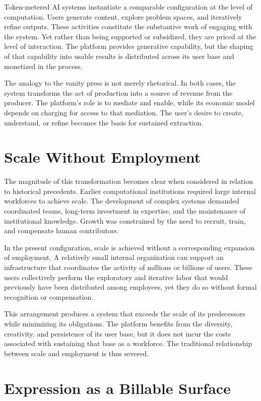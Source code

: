 \documentclass[12pt, oneside]{article}
\begin{document}
Token-metered AI systems instantiate a comparable configuration at the level of computation. Users generate content, explore problem spaces, and iteratively refine outputs. These activities constitute the substantive work of engaging with the system. Yet rather than being supported or subsidized, they are priced at the level of interaction. The platform provides generative capability, but the shaping of that capability into usable results is distributed across its user base and monetized in the process.

The analogy to the vanity press is not merely rhetorical. In both cases, the system transforms the act of production into a source of revenue from the producer. The platform's role is to mediate and enable, while its economic model depends on charging for access to that mediation. The user's desire to create, understand, or refine becomes the basis for sustained extraction.

\section{Scale Without Employment}

The magnitude of this transformation becomes clear when considered in relation to historical precedents. Earlier computational institutions required large internal workforces to achieve scale. The development of complex systems demanded coordinated teams, long-term investment in expertise, and the maintenance of institutional knowledge. Growth was constrained by the need to recruit, train, and compensate human contributors.

In the present configuration, scale is achieved without a corresponding expansion of employment. A relatively small internal organization can support an infrastructure that coordinates the activity of millions or billions of users. These users collectively perform the exploratory and iterative labor that would previously have been distributed among employees, yet they do so without formal recognition or compensation.

This arrangement produces a system that exceeds the scale of its predecessors while minimizing its obligations. The platform benefits from the diversity, creativity, and persistence of its user base, but it does not incur the costs associated with sustaining that base as a workforce. The traditional relationship between scale and employment is thus severed.

\section{Expression as a Billable Surface}
\end{document}
